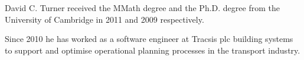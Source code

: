\documentclass[journal]{IEEEtran}
\begin{document}


%

% 

%
\ifCLASSOPTIONpeerreview
\else
\begin{IEEEbiographynophoto}{David C. Turner} received the MMath degree and the
Ph.D. degree from the University of Cambridge in 2011 and 2009 respectively.

Since 2010 he has worked as a software engineer at Tracsis plc building systems
to support and optimise operational planning processes in the transport
industry.

\end{IEEEbiographynophoto}
\fi

%
%


\vfill




\end{document}

